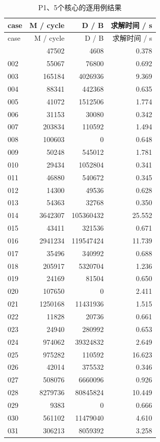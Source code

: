 \documentclass[anonymous,notoc]{gmcm2026}
\begin{document}
\begin{longtable}{lrrr}
\caption{P1、5个核心的逐用例结果}\\
\toprule
case & M / cycle & D / B & 求解时间 / s\\\midrule
\endfirsthead
\toprule
case & M / cycle & D / B & 求解时间 / s\\\midrule
\endhead
\bottomrule\endfoot
001 & 47502 & 4608 & 0.378 \\
002 & 55067 & 76800 & 0.692 \\
003 & 165184 & 4026936 & 9.369 \\
004 & 88341 & 442368 & 0.635 \\
005 & 41072 & 1512506 & 1.774 \\
006 & 31153 & 30080 & 0.342 \\
007 & 203834 & 110592 & 1.494 \\
008 & 100603 & 0 & 0.648 \\
009 & 50248 & 545012 & 1.781 \\
010 & 29434 & 1052804 & 0.341 \\
011 & 46880 & 540672 & 0.345 \\
012 & 14300 & 49536 & 0.628 \\
013 & 54363 & 32768 & 0.350 \\
014 & 3642307 & 105360432 & 25.552 \\
015 & 43411 & 321536 & 0.671 \\
016 & 2941234 & 119547424 & 11.739 \\
017 & 35496 & 340992 & 0.688 \\
018 & 205917 & 5320704 & 1.236 \\
019 & 24169 & 81504 & 0.650 \\
020 & 107650 & 0 & 2.411 \\
021 & 1250168 & 11431936 & 1.515 \\
022 & 11828 & 20736 & 0.661 \\
023 & 24940 & 280992 & 0.653 \\
024 & 974062 & 39324832 & 2.649 \\
025 & 975282 & 110592 & 16.623 \\
026 & 42014 & 375532 & 0.346 \\
027 & 508076 & 6660096 & 0.926 \\
028 & 8279736 & 80845824 & 10.449 \\
029 & 9383 & 0 & 0.666 \\
030 & 561102 & 11479040 & 4.610 \\
031 & 306213 & 8059392 & 3.258 \\

\end{longtable}
\end{document}
